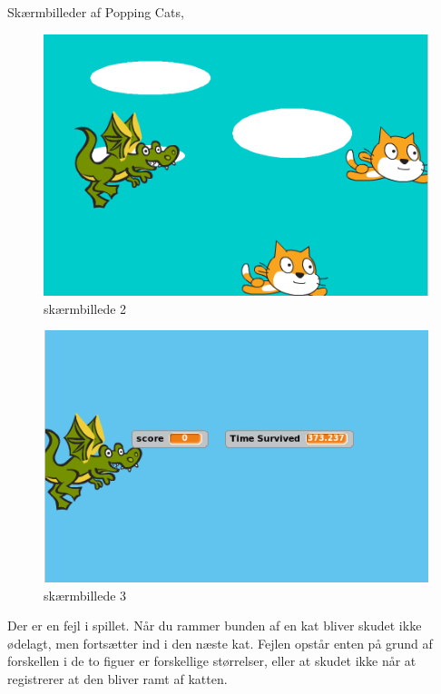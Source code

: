 \documentclass[a4paper]{article}
\begin{document}
Skærmbilleder af Popping Cats,\\
\begin{figure}[h]
	\centering
	\includegraphics[scale=0.3]{screen_game0.png}
	\caption{skærmbillede 2}
	\label{fig: skitse}
\end{figure}
\begin{figure}[h]
	\centering
	\includegraphics[scale=0.3]{screen_game1.png}
	\caption{skærmbillede 3}
	\label{fig: skitse}
\end{figure}


Der er en fejl i spillet. Når du rammer bunden af en kat bliver skudet ikke ødelagt, men fortsætter ind i den næste kat. Fejlen opstår enten på grund af forskellen i de to figuer er forskellige størrelser, eller at skudet ikke når at registrerer at den bliver ramt af katten.
\end{document}
